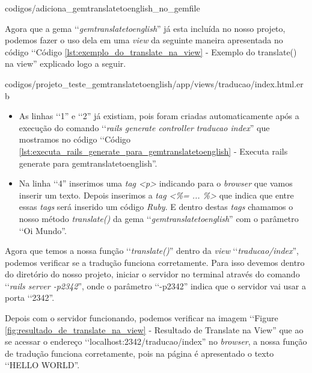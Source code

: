  
{codigos/adiciona_gemtranslatetoenglish_no_gemfile}
 
Agora que a gema ‘‘\emph{gemtranslatetoenglish}'' já esta incluída no nosso projeto, podemos fazer o uso 
dela em uma \emph{view} da seguinte maneira apresentada no código ‘‘Código 
\ref{lst:exemplo_do_translate_na_view} - Exemplo do translate() na view'' explicado logo a seguir.


{codigos/projeto_teste_gemtranslatetoenglish/app/views/traducao/index.html.erb} 
 
 \begin{itemize}
 
  \item As linhas ‘‘1'' e ‘‘2'' já existiam, pois foram criadas automaticamente após a execução do comando 
  ‘‘\emph{rails generate controller traducao index}'' que mostramos no código ‘‘Código 
  \ref{lst:executa_rails_generate_para_gemtranslatetoenglish} - Executa rails generate para 
  gemtranslatetoenglish''.
  
  \item Na linha ‘‘4'' inserimos uma \emph{tag <p>} indicando para o \emph{browser} que vamos inserir um 
  texto. Depois inserimos a \emph{tag <\%= ... \%>} que indica que entre essas \emph{tags} será inserido um 
  código \emph{Ruby}. E dentro destas \emph{tags} chamamos o nosso método \emph{translate()} da gema 
  ‘‘\emph{gemtranslatetoenglish}'' com o parâmetro ‘‘Oi Mundo''.
  
 \end{itemize}

Agora que temos a nossa função ‘‘\emph{translate()}'' dentro da \emph{view} ‘‘\emph{traducao/index}'', podemos 
verificar se a tradução funciona corretamente. Para isso devemos dentro do diretório do nosso projeto,
iniciar o servidor no terminal através do comando ‘‘\emph{rails server -p2342}'', onde o parâmetro ‘‘-p2342'' 
indica que o servidor vai usar a porta ‘‘2342''. 

Depois com o servidor funcionando, podemos verificar na imagem ‘‘Figure \ref{fig:resultado_de_translate_na_view} - 
Resultado de Translate na View'' que ao se acessar o endereço ‘‘localhost:2342/traducao/index'' no 
\emph{browser}, a nossa função de tradução funciona corretamente, pois na página é apresentado o 
texto ‘‘HELLO WORLD''.
 
